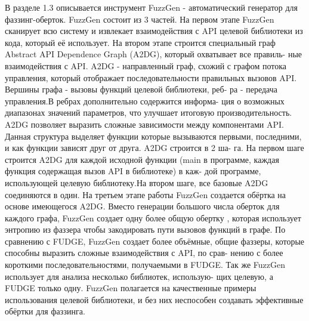 В разделе 1.3 описывается инструмент FuzzGen - автоматический генератор для фаззинг-оберток. FuzzGen состоит из 3 частей. На первом этапе FuzzGen сканирует всю систему и извлекает взаимодействия с API целевой библиотеки из кода, который её использует. На втором этапе строится специальный граф Abstract API Dependence Graph (A2DG), который охватывает все правиль- ные взаимодействия с API. A2DG - направленный граф, схожий с графом потока управления, который отображает последовательности правильных вызовов API. Вершины графа - вызовы функций целевой библиотеки, реб- ра - передача управления.В ребрах дополнительно содержится информа- ция о возможных диапазонах значений параметров, что улучшает итоговую производительность. A2DG позволяет выразить сложные зависимости между компонентами API. Данная структура выделяет функции которые вызываются первыми, последними, и как функции зависят друг от друга. A2DG строится в 2 ша- га. На первом шаге строится A2DG для каждой исходной функции (main в программе, каждая функция содержащая вызов API в библиотеке) в каж- дой программе, использующей целевую библиотеку.На втором шаге, все базовые A2DG соединяются в один.
На третьем этапе работы FuzzGen создается обёртка на основе имеющегося A2DG. Вместо генерации большого числа оберток для каждого графа, FuzzGen создает одну более общую обертку , которая использует энтропию из фаззера чтобы закодировать пути вызовов функций в графе.
По сравнению с FUDGE, FuzzGen создает более объёмные, общие фаззеры, которые способны выразить сложные взаимодействия с API, по срав- нению с более короткими последовательностями, получаемыми в FUDGE. Так же FuzzGen использует для анализа несколько библиотек, использую- щих целевую, а FUDGE только одну. FuzzGen полагается на качественные примеры использования целевой библиотеки, и без них неспособен создавать эффективные обёртки для фаззинга.

